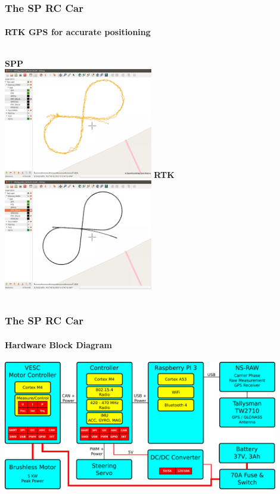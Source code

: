 \documentclass[aspectratio=169,electronics,notopline]{beamer}
\begin{document}
\begin{frame}[c]
\frametitle{The SP RC Car}
\framesubtitle{RTK GPS for accurate positioning}
\begin{center}
	\begin{columns}[c]
			\centering
			\textbf{SPP}\\
			\vspace{0.2cm}
			\includegraphics[width=65mm]{Figures/viking_dyn_spp.png}
			\centering
			\textbf{RTK}\\
			\vspace{0.2cm}
			\includegraphics[width=65mm]{Figures/viking_dyn_rtk.png}
	\end{columns}
\end{center}
\end{frame}

\begin{frame} 
\frametitle{The SP RC Car}
\framesubtitle{Hardware Block Diagram}
\begin{center}
	\includegraphics[width=12cm]{Figures/block_diagram.pdf}
\end{center}
\end{frame}
\end{document}
